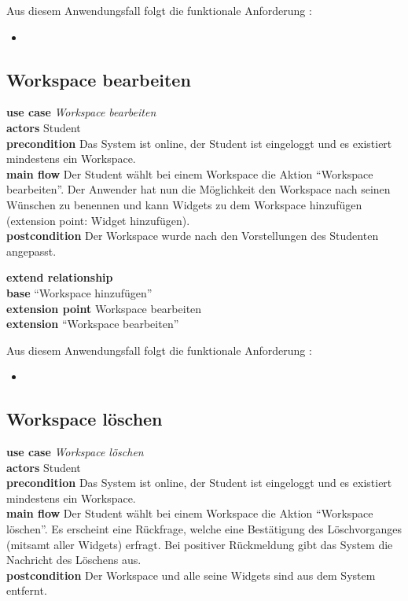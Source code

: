 Aus diesem Anwendungsfall folgt die funktionale Anforderung :
\begin{itemize}
 \item \requirement{\requirementWorkspaceAdd}\label{requirementWorkspaceAdd}
\end{itemize}
 
\subsection{Workspace bearbeiten}
\textbf{use case} \emph{Workspace bearbeiten}\\
\textbf{actors} Student\\
\textbf{precondition} Das System ist online, der Student ist eingeloggt und es existiert mindestens ein Workspace.\\
\textbf{main flow} Der Student wählt bei einem Workspace die Aktion "`Workspace bearbeiten"'. Der Anwender hat nun die Möglichkeit den Workspace nach seinen Wünschen zu benennen und kann Widgets zu dem Workspace hinzufügen (extension point: Widget hinzufügen).\\
\textbf{postcondition} Der Workspace wurde nach den Vorstellungen des Studenten angepasst.
 
\textbf{extend relationship}\\
\textbf{base} "`Workspace hinzufügen"'\\
\textbf{extension point} Workspace bearbeiten\\
\textbf{extension} "`Workspace bearbeiten"'
 
Aus diesem Anwendungsfall folgt die funktionale Anforderung :
\begin{itemize}
 \item \requirement{\requirementWorkspaceEdit}\label{requirementWorkspaceEdit}
\end{itemize}
 
\subsection{Workspace löschen}
\textbf{use case} \emph{Workspace löschen}\\
\textbf{actors} Student\\
\textbf{precondition} Das System ist online, der Student ist eingeloggt und es existiert mindestens ein Workspace.\\
\textbf{main flow} Der Student wählt bei einem Workspace die Aktion "`Workspace löschen"'. Es erscheint eine Rückfrage, welche eine Bestätigung des Löschvorganges (mitsamt aller Widgets) erfragt. Bei positiver Rückmeldung gibt das System die Nachricht des Löschens aus. \\
\textbf{postcondition} Der Workspace und alle seine Widgets sind aus dem System entfernt.
 
